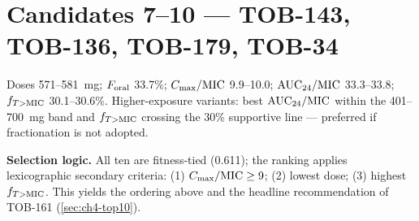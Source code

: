 \section*{Candidates 7--10 --- TOB-143, TOB-136, TOB-179, TOB-34}
Doses 571--581~mg; $F_{\mathrm{oral}}$ 33.7\%; $C_{\max}/\mathrm{MIC}$ 9.9--10.0; $\mathrm{AUC}_{24}/\mathrm{MIC}$ 33.3--33.8; $f_{T>\mathrm{MIC}}$ 30.1--30.6\%. Higher-exposure variants: best $\mathrm{AUC}_{24}/\mathrm{MIC}$ within the 401--700~mg band and $f_{T>\mathrm{MIC}}$ crossing the 30\% supportive line --- preferred if fractionation is not adopted.

\medskip
\noindent\textbf{Selection logic.} All ten are fitness-tied (0.611); the ranking applies lexicographic secondary criteria: (1) $C_{\max}/\mathrm{MIC} \geq 9$; (2) lowest dose; (3) highest $f_{T>\mathrm{MIC}}$. This yields the ordering above and the headline recommendation of TOB-161 (\cref{sec:ch4-top10}).
